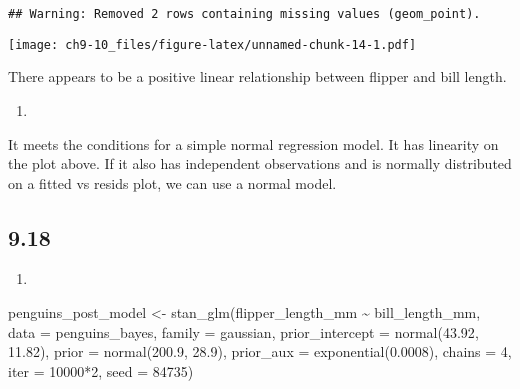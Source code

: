 \documentclass[
]{article}
\newenvironment{Shaded}{\begin{snugshade}}{\end{snugshade}}
\newcommand{\AttributeTok}[1]{\textcolor[rgb]{0.77,0.63,0.00}{#1}}
\newcommand{\DecValTok}[1]{\textcolor[rgb]{0.00,0.00,0.81}{#1}}
\newcommand{\FloatTok}[1]{\textcolor[rgb]{0.00,0.00,0.81}{#1}}
\newcommand{\FunctionTok}[1]{\textcolor[rgb]{0.00,0.00,0.00}{#1}}
\newcommand{\NormalTok}[1]{#1}
\newcommand{\OtherTok}[1]{\textcolor[rgb]{0.56,0.35,0.01}{#1}}
\newcommand{\SpecialCharTok}[1]{\textcolor[rgb]{0.00,0.00,0.00}{#1}}
\providecommand{\tightlist}{%
  \setlength{\itemsep}{0pt}\setlength{\parskip}{0pt}}
\begin{document}
\begin{verbatim}
## Warning: Removed 2 rows containing missing values (geom_point).
\end{verbatim}

\texttt{[image: ch9-10\_files/figure-latex/unnamed-chunk-14-1.pdf]}

There appears to be a positive linear relationship between flipper and
bill length.

\begin{enumerate}
\def\labelenumi{\alph{enumi}.}
\setcounter{enumi}{1}
\tightlist
\item
\end{enumerate}

It meets the conditions for a simple normal regression model. It has
linearity on the plot above. If it also has independent observations and
is normally distributed on a fitted vs resids plot, we can use a normal
model.

\hypertarget{section-6}{%
\subsection{9.18}\label{section-6}}

\begin{enumerate}
\def\labelenumi{\alph{enumi}.}
\tightlist
\item
\end{enumerate}

\begin{Shaded}
\begin{Highlighting}[]
\NormalTok{penguins\_post\_model }\OtherTok{\textless{}{-}} \FunctionTok{stan\_glm}\NormalTok{(flipper\_length\_mm }\SpecialCharTok{\textasciitilde{}}\NormalTok{ bill\_length\_mm, }\AttributeTok{data =}\NormalTok{ penguins\_bayes,}
                       \AttributeTok{family =}\NormalTok{ gaussian,}
                       \AttributeTok{prior\_intercept =} \FunctionTok{normal}\NormalTok{(}\FloatTok{43.92}\NormalTok{, }\FloatTok{11.82}\NormalTok{),}
                       \AttributeTok{prior =} \FunctionTok{normal}\NormalTok{(}\FloatTok{200.9}\NormalTok{, }\FloatTok{28.9}\NormalTok{), }
                       \AttributeTok{prior\_aux =} \FunctionTok{exponential}\NormalTok{(}\FloatTok{0.0008}\NormalTok{),}
                       \AttributeTok{chains =} \DecValTok{4}\NormalTok{, }\AttributeTok{iter =} \DecValTok{10000}\SpecialCharTok{*}\DecValTok{2}\NormalTok{, }\AttributeTok{seed =} \DecValTok{84735}\NormalTok{)}
\end{Highlighting}
\end{Shaded}
\end{document}
